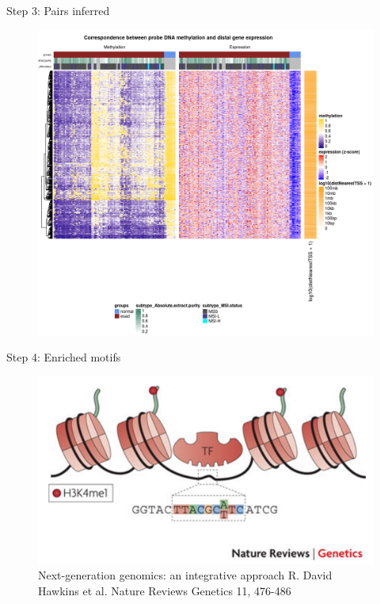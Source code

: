 \documentclass[slidestop,compress,11pt,xcolor=dvipsnames]{beamer}
\begin{document}
\begin{frame}{Step 3: Pairs inferred}
 \vspace*{-0.3cm}
 \begin{figure}
  \centering
  \includegraphics[width=0.75\linewidth]{ELMER/heatmappair.png}
 \end{figure}
\end{frame}


\begin{frame}{Step 4: Enriched motifs}

 \vspace*{-0.3cm}
 \begin{figure}
  \centering
  \includegraphics[width=1.0\linewidth]{ELMER/tf_binding.png}{\tiny{\\Next-generation genomics: an integrative approach R. David Hawkins et al. Nature Reviews Genetics 11, 476-486}}
 \end{figure}
\end{frame}
\end{document}
